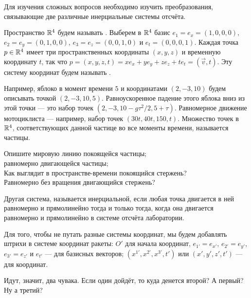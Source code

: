 \documentclass[a4paper,12pt]{article}
\begin{document}

{\small
Для изучения сложных вопросов необходимо изучить преобразования, связывающие две различные инерциальные системы отсчёта.

Пространство $\mathbb{R}^4$ будем называть .
Выберем в $\mathbb{R}^4$ базис $e_1 = e_x = (1,0,0,0)$, $e_2 = e_y = (0,1,0,0)$, $e_3 = e_z = (0,0,1,0)$ и $e_t=(0,0,0,1)$.
Каждая точка $p\in\mathbb{R}^4$ имеет три пространственных координаты $(x,y,z)$ и временную координату $t$, так что $p = (x,y,z,t)= x e_x + y e_y + z e_z + t e_t = (\vec{v},t)$. Эту систему координат будем называть .

Например, яблоко в момент времени $5$ и координатами $(2,-3,10)$ будем описывать точкой $(2,-3,10,5)$. Равноускоренное падение этого яблока вниз из этой точки --- это набор точек $(2,-3,10-g\tau^2/2,5+\tau)$. Равномерное движение мотоциклиста --- например, набор точек $(30t,40t,150,t)$. Множество точек в $\mathbb{R}^4$, соответствующих данной частице во все моменты времени, называется  частицы.

}

    Опишите мировую линию
     покоящейся частицы;\\
     равномерно двигающейся частицы;\\
     Как выглядит в пространстве-времени покоящийся стержень?\\
     Равномерно без вращения двигающийся стержень?


{\small
Другая система, называется  инерциальной, если любая точка двигается в ней равномерно и прямолинейно тогда и только тогда, когда она двигается равномерно и прямолинейно в системе отсчёта лаборатории.

Для того, чтобы не путать разные системы координат, мы будем добавлять штрихи в системе координат  ракеты: $O'$ для начала координат, $e_{1'}=e_{x'}$, $e_{2'}=e_{y'}$, $e_{3'}=e_{z'}$ и $e_{t'}$ --- для базисных векторов; $(x^{1'},x^{2'},x^{3'},t')$ или  $(x',y',z',t')$ --- для координат.


}



  Идут, значит, два чувака.
    Если один дойдёт, то куда денется второй?
    А первый?
    Ну а третий?
\end{document}
